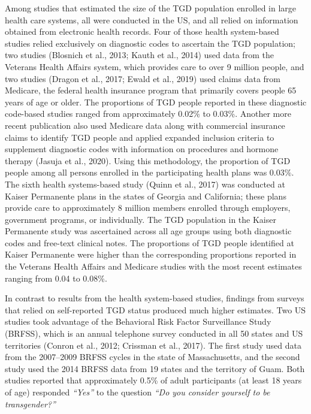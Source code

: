 \documentclass[
]{book}
\begin{document}
Among studies that estimated the size of the
TGD population enrolled in large health care
systems, all were conducted in the US, and all
relied on information obtained from electronic
health records. Four of those health system-based
studies relied exclusively on diagnostic codes to
ascertain the TGD population; two studies
(Blosnich et al., 2013; Kauth et al., 2014) used
data from the Veterans Health Affairs system,
which provides care to over 9 million people,
and two studies (Dragon et al., 2017; Ewald et al.,
2019) used claims data from Medicare, the federal
health insurance program that primarily covers
people 65 years of age or older. The proportions
of TGD people reported in these diagnostic
code-based studies ranged from approximately
0.02\% to 0.03\%. Another more recent publication
also used Medicare data along with commercial
insurance claims to identify TGD people and
applied expanded inclusion criteria to supplement
diagnostic codes with information on procedures
and hormone therapy (Jasuja et al., 2020). Using
this methodology, the proportion of TGD people
among all persons enrolled in the participating
health plans was 0.03\%. The sixth health
systems-based study (Quinn et al., 2017) was
conducted at Kaiser Permanente plans in the
states of Georgia and California; these plans provide care to approximately 8 million members
enrolled through employers, government programs, or individually. The TGD population in
the Kaiser Permanente study was ascertained
across all age groups using both diagnostic codes
and free-text clinical notes. The proportions of
TGD people identified at Kaiser Permanente were
higher than the corresponding proportions
reported in the Veterans Health Affairs and
Medicare studies with the most recent estimates
ranging from 0.04 to 0.08\%.

In contrast to results from the health
system-based studies, findings from surveys that
relied on self-reported TGD status produced
much higher estimates. Two US studies took
advantage of the Behavioral Risk Factor
Surveillance Study (BRFSS), which is an annual
telephone survey conducted in all 50 states and
US territories (Conron et al., 2012; Crissman
et al., 2017). The first study used data from the
2007--2009 BRFSS cycles in the state of
Massachusetts, and the second study used the
2014 BRFSS data from 19 states and the territory
of Guam. Both studies reported that approximately 0.5\% of adult participants (at least 18
years of age) responded \emph{``Yes''} to the question \emph{``Do
you consider yourself to be transgender?''}
\end{document}
